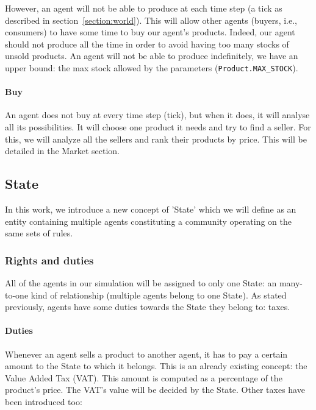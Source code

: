     However, an agent will not be able to produce at each time step (a tick as described in section~\ref{section:world}). This will allow other agents (buyers, i.e., consumers) to have some time to buy our agent's products. Indeed, our agent should not produce all the time in order to avoid having too many stocks of unsold products. An agent will not be able to produce indefinitely, we have an upper bound: the max stock allowed by the parameters (\texttt{Product.MAX\_STOCK}).

    \paragraph{Buy} 
    An agent does not buy at every time step (tick), but when it does, it will analyse all its possibilities. It will choose one product it needs and try to find a seller. For this, we will analyze all the sellers and rank their products by price. This will be detailed in the Market section.


\subsection{State}\label{section:state}
In this work, we introduce a new concept of 'State' which we will define as an entity containing multiple agents constituting a community operating on the same sets of rules.

    \subsubsection{Rights and duties}
    All of the agents in our simulation will be assigned to only one State: an many-to-one kind of relationship (multiple agents belong to one State). As stated previously, agents have some duties towards the State they belong to: taxes.

        \paragraph{Duties}
            Whenever an agent sells a product to another agent, it has to pay a certain amount to the State to which it belongs. This is an already existing concept: the Value Added Tax (VAT). This amount is computed as a percentage of the product's price. The VAT's value will be decided by the State. Other taxes have been introduced too:

